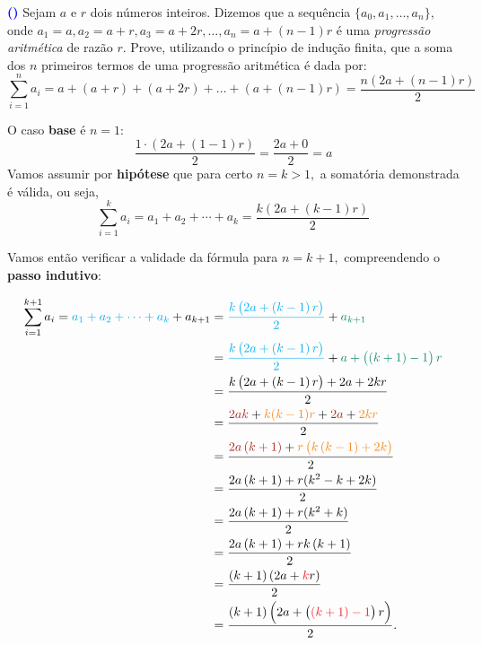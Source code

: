 \documentclass[12pt, a4paper]{article}
\newcounter{exercicio}[section]
\newenvironment{exercicio}[1][]{\refstepcounter{exercicio}\par\medskip
 \textcolor{blue}{\bf(\theexercicio)} \rmfamily}{\medskip }
\begin{document}
\begin{exercicio}
Sejam $a$ e $r$ dois números inteiros. Dizemos que a sequência $\{a_0, a_1, \ldots, a_n \},$ onde $a_1 = a, a_2 = a + r, a_3 = a + 2r, \ldots, a_n = a + (n - 1)r$ é uma \textit{progressão aritmética} de razão $r.$ Prove, utilizando o princípio de indução finita,
que a soma dos $n$ primeiros termos de uma progressão aritmética é dada por:
\[\sum\limits_{i = 1}^n a_i = a + (a + r) + (a + 2r) + \ldots + (a + (n-1)r) =\dfrac{n(2a + (n-1)r)}{2}\]
\end{exercicio}
\begin{solution}
O caso \textbf{base} é $n = 1$:
$$\frac{1\cdot\left( 2a+ \left( 1-1 \right) r \right) }{2}=\frac{2a+0}{2}=a$$
Vamos assumir por \textbf{hipótese} que para certo $n = k > 1,$ a somatória demonstrada é válida, ou seja,
$$\sum\limits_{i=1}^{k} a_i = a_{1}+a_{2}+ \cdots +a_{k}=\frac{k \left( 2a+ \left( k-1 \right) r \right) }{2}$$

Vamos então verificar a validade da fórmula para $n = k + 1,$ compreendendo o \textbf{passo indutivo}:

\begin{align*}
\sum\limits_{i=1}^{k+1} a_i = \textcolor{Cyan}{a_{1}+a_{2}+ \cdots +a_{k}}+a_{k+1}&=\textcolor{Cyan}{\frac{k \left( 2a+ \left( k-1 \right) r \right) }{2}}+\textcolor{PineGreen}{a_{k+1}}\\&=\textcolor{Cyan}{\frac{k \left( 2a+ \left( k-1 \right) r \right) }{2}}+\textcolor{PineGreen}{a+ \left( (k+1)-1 \right) r}\\&=
\frac{k \left( 2a+ \left( k-1 \right) r \right) +2a+2kr}{2}\\&=
\frac{\textcolor{Mahogany}{2ak} + \textcolor{BurntOrange}{k(k-1)r} + \textcolor{Mahogany}{2a} + \textcolor{BurntOrange}{2kr}}{2}\\
&=\frac{\textcolor{Mahogany}{2a \left( k+1 \right)} +\textcolor{BurntOrange}{r \left(  k\left( k-1 \right) +2k \right)} }{2}\\
&=\frac{2a \left( k+1 \right) +r (k^2 - k + 2k) }{2}\\
&=\frac{2a \left( k+1 \right) +r (k^2 + k) }{2}\\
&=\frac{2a \left( k+1 \right) +rk \left( k+1 \right) }{2}\\
&=\frac{ \left( k+1 \right)  \left( 2a+ \textcolor{Red}{k} r \right) }{2}\\
&=\frac{ \left( k+1 \right)  \left( 2a+ \left( \textcolor{Red}{(k+1)-1} \right) r \right) }{2}.
\end{align*}
\end{solution}
\end{document}
